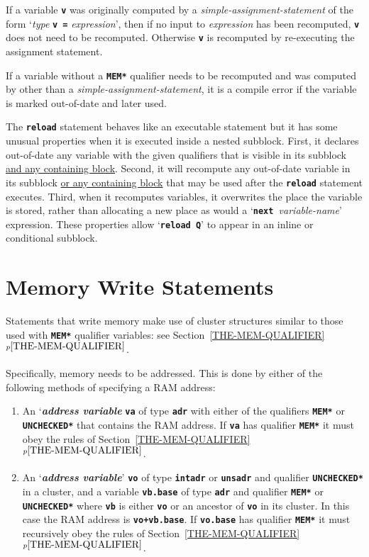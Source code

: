 \documentclass[12pt]{article}
\newcommand{\TT}[1]{{\tt \bfseries #1}}
\newcommand{\key}[1]{{\bf \em #1}\index{#1}}
\newcommand{\itemref}[1]{\ref{#1}$^{p\pageref{#1}}$}
\begin{document}
If a variable \TT{v} was originally computed by
a {\em simple-assignment-statement}
of the form `{\em type} \TT{v =} {\em expression}', then if
no input to {\em expression} has been recomputed, \TT{v} does not
need to be recomputed.  Otherwise \TT{v} is recomputed by re-executing
the assignment statement.

If a variable without a \TT{*MEM*} qualifier needs to be
recomputed and was computed by other than
a {\em simple-assignment-statement}, it is a compile error if the
variable is marked out-of-date and later used.

The \TT{reload} statement behaves like an executable statement but
it has some unusual properties when it is executed inside a
nested subblock.  First, it declares out-of-date any variable with
the given qualifiers that is visible in its subblock \underline{and any
containing block}.
Second, it will recompute any out-of-date variable in its subblock
\underline{or any containing block} that may be used after the
\TT{reload} statement executes.
Third, when it recomputes variables, it overwrites
the place the variable is stored, rather than allocating a new
place as would a `\TT{next~}{\em variable-name}' expression.
These properties allow `\TT{reload Q}' to appear in an inline
or conditional subblock.

\section{Memory Write Statements}
\label{MEMORY-WRITE-STATEMENTS}

Statements that write memory make use of cluster structures
similar to those used with
\TT{*MEM*} qualifier variables:
see Section~\itemref{THE-MEM-QUALIFIER}.

Specifically, memory needs to be addressed.  This is done by either
of the following methods of specifying a RAM address:
\begin{enumerate}
\item
An `\key{address variable} \TT{va}
of type \TT{adr} with either of the qualifiers
\TT{*MEM*} or \TT{*UNCHECKED*} that contains the RAM address.
If \TT{va} has qualifier \TT{*MEM*} it must obey
the rules of Section~\itemref{THE-MEM-QUALIFIER}.


\item
An `\key{address variable}' \TT{vo} of type \TT{intadr} or \TT{unsadr} and
qualifier \TT{*UNCHECKED*} in a cluster, and
a variable \TT{vb.base} of type \TT{adr} and qualifier \TT{*MEM*}
or \TT{*UNCHECKED*} where \TT{vb} is either \TT{vo} or an ancestor
of \TT{vo} in its cluster.
In this case the RAM address is \TT{vo+vb.base}.
If \TT{vo.base} has qualifier \TT{*MEM*} it must recursively obey
the rules of Section~\itemref{THE-MEM-QUALIFIER}.

\end{enumerate}
\end{document}
